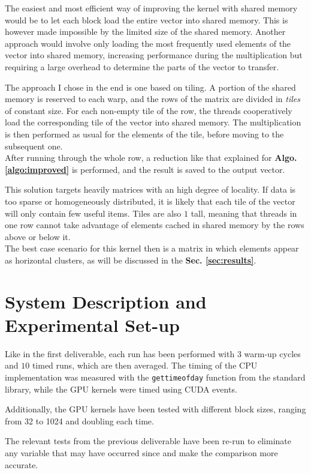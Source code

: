 \documentclass[conference]{IEEEtran}
\begin{document}
The easiest and most efficient way of improving the kernel with shared memory would be to let each block load the entire vector into shared memory. This is however made impossible by the limited size of the shared memory. Another approach would involve only loading the most frequently used elements of the vector into shared memory, increasing performance during the multiplication but requiring a large overhead to determine the parts of the vector to transfer.

The approach I chose in the end is one based on tiling. A portion of the shared memory is reserved to each warp, and the rows of the matrix are divided in \textit{tiles} of constant size. For each non-empty tile of the row, the threads cooperatively load the corresponding tile of the vector into shared memory. The multiplication is then performed as usual for the elements of the tile, before moving to the subsequent one.\\
After running through the whole row, a reduction like that explained for \textbf{Algo. \ref{algo:improved}} is performed, and the result is saved to the output vector.

This solution targets heavily matrices with an high degree of locality. If data is too sparse or homogeneously distributed, it is likely that each tile of the vector will only contain few useful items. Tiles are also $1$ tall, meaning that threads in one row cannot take advantage of elements cached in shared memory by the rows above or below it.\\
The best case scenario for this kernel then is a matrix in which elements appear as horizontal clusters, as will be discussed in the \textbf{Sec. \ref{sec:results}}.

\section{System Description and Experimental Set-up}
Like in the first deliverable, each run has been performed with $3$ warm-up cycles and $10$ timed runs, which are then averaged. The timing of the CPU implementation was measured with the \texttt{gettimeofday} function from the standard library, while the GPU kernels were timed using CUDA events.

Additionally, the GPU kernels have been tested with different block sizes, ranging from 32 to 1024 and doubling each time.

The relevant tests from the previous deliverable have been re-run to eliminate any variable that may have occurred since and make the comparison more accurate.
\end{document}
